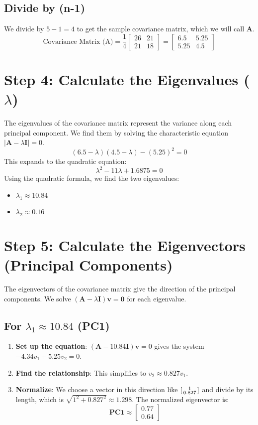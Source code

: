 \documentclass{article}
\begin{document}
\subsection{Divide by (n-1)}
We divide by $5-1 = 4$ to get the sample covariance matrix, which we will call $\mathbf{A}$.
\[
\text{Covariance Matrix (A)} = \frac{1}{4}
\begin{bmatrix}
26 & 21 \\
21 & 18
\end{bmatrix}
=
\begin{bmatrix}
6.5 & 5.25 \\
5.25 & 4.5
\end{bmatrix}
\]

\section{Step 4: Calculate the Eigenvalues ($\lambda$)}

The eigenvalues of the covariance matrix represent the variance along each principal component. We find them by solving the characteristic equation $|\mathbf{A} - \lambda\mathbf{I}| = 0$.
\[
(6.5 - \lambda)(4.5 - \lambda) - (5.25)^2 = 0
\]
This expands to the quadratic equation:
\[
\lambda^2 - 11\lambda + 1.6875 = 0
\]
Using the quadratic formula, we find the two eigenvalues:
\begin{itemize}
    \item $\lambda_1 \approx 10.84$
    \item $\lambda_2 \approx 0.16$
\end{itemize}

\section{Step 5: Calculate the Eigenvectors (Principal Components)}

The eigenvectors of the covariance matrix give the direction of the principal components. We solve $(\mathbf{A} - \lambda\mathbf{I})\mathbf{v} = \mathbf{0}$ for each eigenvalue.

\subsection{For $\lambda_1 \approx 10.84$ (PC1)}
\begin{enumerate}
    \item \textbf{Set up the equation}: $(\mathbf{A} - 10.84\mathbf{I})\mathbf{v} = 0$ gives the system $-4.34v_1 + 5.25v_2 = 0$.
    \item \textbf{Find the relationship}: This simplifies to $v_2 \approx 0.827v_1$.
    \item \textbf{Normalize}: We choose a vector in this direction like $\begin{bsmallmatrix} 1 \\ 0.827 \end{bsmallmatrix}$ and divide by its length, which is $\sqrt{1^2 + 0.827^2} \approx 1.298$. The normalized eigenvector is:
    \[ \textbf{PC1} \approx \begin{bmatrix} 0.77 \\ 0.64 \end{bmatrix} \]
\end{enumerate}
\end{document}
